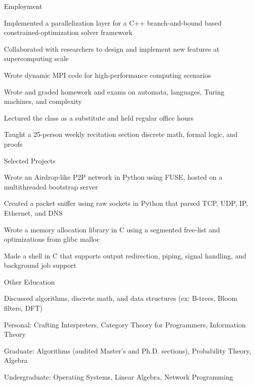 \documentclass{cv}
\begin{document}
\begin{cvsection}{Employment}
{  }
  {
    \item Implemented a parallelization layer for a C++ branch-and-bound based constrained-optimization solver framework
    \item Collaborated with researchers to design and implement new features at supercomputing scale
    \item Wrote dynamic MPI code for high-performance computing scenarios
  }
  {
    \item Wrote and graded homework and exams on automata, languages, Turing machines, and complexity
    \item Lectured the class as a substitute and held regular office hours
  }
  {
    \item Taught a 25-person weekly recitation section discrete math, formal logic, and proofs
  }
\end{cvsection}

\begin{cvsection}{Selected Projects}
  {
    \item Wrote an Airdrop-like P2P network in Python using FUSE, hosted on a multithreaded bootstrap server
  }
  {
    \item Created a packet sniffer using raw sockets in Python that parsed TCP, UDP, IP, Ethernet, and DNS
  }
  {
    \item Wrote a memory allocation library in C using a segmented free-list and optimizations from glibc malloc
  }
  {
    \item Made a shell in C that supports output redirection, piping, signal handling, and background job support
  }
\end{cvsection}

\begin{cvsection}{Other Education}
  {
    \item Discussed algorithms, discrete math, and data structures (ex: B-trees, Bloom filters, DFT)
  }
  {
  \item Personal: Crafting Interpreters, Category Theory for Programmers, Information Theory
  \item Graduate: Algorithms (audited Master's and Ph.D. sections), Probability Theory, Algebra
  \item Undergraduate: Operating Systems, Linear Algebra, Network Programming
  }
\end{cvsection}
\end{document}
